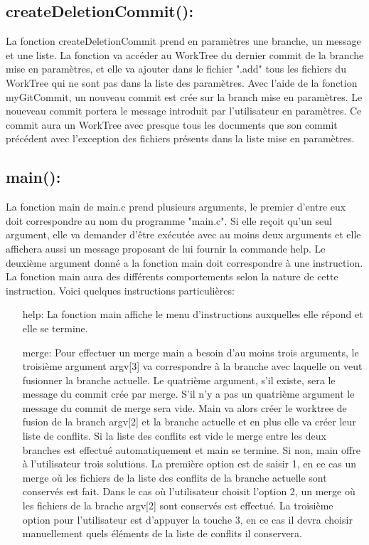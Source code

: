 \documentclass[12pt,francais]{article}
\begin{document}
\subsection{createDeletionCommit():}
	La fonction createDeletionCommit prend en paramètres une branche, un message et une liste. La fonction va accéder au WorkTree du dernier commit de la branche mise en paramètres, et elle va ajouter dans le fichier ".add" tous les fichiers du WorkTree qui ne sont pas dans la liste des paramètres.  Avec l'aide de la fonction myGitCommit, un nouveau commit est crée sur la branch mise en paramètres. Le noueveau commit portera le message introduit par l'utilisateur en paramètres. Ce commit aura un WorkTree avec presque tous les documents que son commit précédent avec l'exception des fichiers présents dans la liste mise en paramètres. 
	
\subsection{main():}  La fonction main de main.c prend plusieurs arguments, le premier d'entre eux doit correspondre au nom du programme "main.c". Si elle reçoit qu'un seul argument, elle va demander d'être exécutée avec au moins deux arguments et elle affichera aussi un message proposant de lui fournir la commande help. Le deuxième argument donné a la fonction main doit correspondre à une instruction. La fonction main aura des différents comportements selon la nature de cette instruction. Voici quelques instructions particulières:
\begin{itemize}
\item[help:] La fonction main affiche le menu d'instructions auxquelles elle répond et elle se termine.
\item[merge:] Pour effectuer un merge main a besoin d'au moins trois arguments, le troisième argument argv[3] va correspondre à la branche avec laquelle on veut fusionner la branche actuelle. Le quatrième argument, s'il existe, sera le message du commit crée par merge. S'il n'y a pas un quatrième argument le message du commit de merge sera vide. Main va alors créer le worktree de fusion de la branch argv[2] et la branche actuelle et en plus elle va créer leur liste de conflits. Si la liste des conflits est vide le merge entre les deux branches est effectué automatiquement et main se termine. Si non, main offre à l'utilisateur trois solutions. La première option est de saisir 1, en ce cas un merge où les fichiers de la liste des conflits de la branche actuelle sont conservés est fait.  Dans le cas où l'utilisateur choisit l'option 2, un merge où les fichiers de la brache argv[2] sont conservés est effectué. La troisième option pour l'utilisateur est d'appuyer la touche 3, en ce cas il devra choisir manuellement quels éléments de la liste de conflits il conservera.
\end{itemize}
\end{document}

